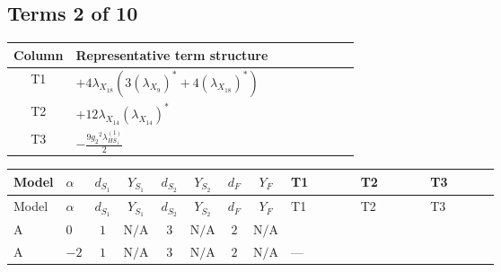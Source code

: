\documentclass[8pt]{article}
\begin{document}
\begin{landscape}
\subsection*{Terms 2 of 10}
\begin{center}
\begin{tabular}{@{}c >{\raggedright\arraybackslash}p{0.82\linewidth}@{}}
\toprule
Column & Representative term structure \\
\midrule
T1 & \(\displaystyle +4 {\lambda_{X_{18}}} (3 \left({\lambda_{X_{9}}}\right)^{*}+4 \left({\lambda_{X_{18}}}\right)^{*})\) \\
\midrule
T2 & \(\displaystyle +12 {\lambda_{X_{14}}} \left({\lambda_{X_{14}}}\right)^{*}\) \\
\midrule
T3 & \(\displaystyle -\frac{9 {g_2}^2 {\lambda_{HS_1}^{(1)}}}{2}\) \\
\midrule
\bottomrule
\end{tabular}
\end{center}
\smallskip
\tiny
\begin{longtable}{@{}llcccccc >{\raggedright\arraybackslash}p{0.21\linewidth} >{\raggedright\arraybackslash}p{0.21\linewidth} >{\raggedright\arraybackslash}p{0.21\linewidth}@{}}
\toprule
Model & $\alpha$ & $d_{S_1}$ & $Y_{S_1}$ & $d_{S_2}$ & $Y_{S_2}$ & $d_F$ & $Y_F$ & T1 & T2 & T3 \\
\midrule
\endfirsthead
\toprule
Model & $\alpha$ & $d_{S_1}$ & $Y_{S_1}$ & $d_{S_2}$ & $Y_{S_2}$ & $d_F$ & $Y_F$ & T1 & T2 & T3 \\
\midrule
\endhead
A & $0$ & $1$ & $\text{N/A}$ & $3$ & $\text{N/A}$ & $2$ & $\text{N/A}$ & \scriptsize\adjustbox{max width=\linewidth}{$\begin{gathered} +4 {\lambda_{X_{18}}} (3 \left({\lambda_{X_{9}}}\right)^{*}+4 \left({\lambda_{X_{18}}}\right)^{*})\end{gathered}$} & \scriptsize\adjustbox{max width=\linewidth}{$\begin{gathered} +12 {\lambda_{X_{14}}} \left({\lambda_{X_{14}}}\right)^{*}\end{gathered}$} & \scriptsize\adjustbox{max width=\linewidth}{$\begin{gathered} -\frac{9 {g_2}^2 {\lambda_{HS_1}^{(1)}}}{2}\end{gathered}$} \\
\midrule
A & $-2$ & $1$ & $\text{N/A}$ & $3$ & $\text{N/A}$ & $2$ & $\text{N/A}$ & --- & \scriptsize\adjustbox{max width=\linewidth}{$\begin{gathered} +12 {\lambda_{X_{12}}} \left({\lambda_{X_{12}}}\right)^{*}\end{gathered}$} & \scriptsize\adjustbox{max width=\linewidth}{$\begin{gathered} -\frac{9 {g_2}^2 {\lambda_{HS_1}^{(1)}}}{2}\end{gathered}$} \\

\end{longtable}
\end{landscape}
\end{document}
